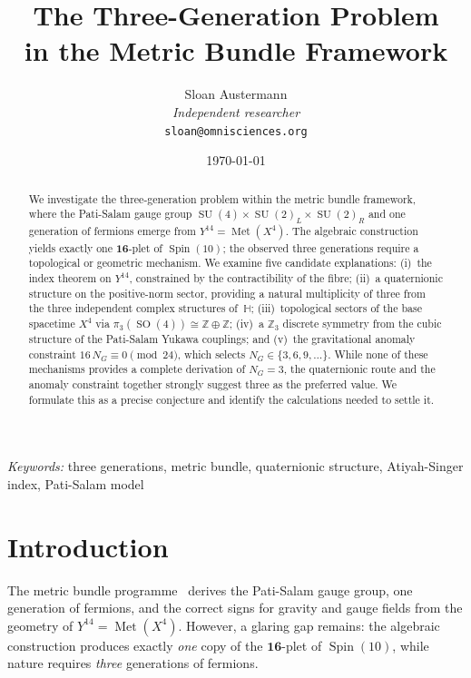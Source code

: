 \documentclass[12pt,a4paper]{article}
\title{\textbf{The Three-Generation Problem\\ in the Metric Bundle Framework}}
\author{Sloan Austermann\\[4pt]
\small\textit{Independent researcher}\\
\small\texttt{sloan@omnisciences.org}}
\date{\today}
\theoremstyle{definition}
\newcommand{\Met}{\operatorname{Met}}
\newcommand{\SO}{\operatorname{SO}}
\newcommand{\SU}{\operatorname{SU}}
\newcommand{\Spin}{\operatorname{Spin}}
\newcommand{\Z}{\mathbb{Z}}
\newcommand{\HH}{\mathbb{H}}
\begin{document}
\maketitle

\begin{abstract}
We investigate the three-generation problem within the metric bundle framework, where the Pati-Salam gauge group $\SU(4) \times \SU(2)_L \times \SU(2)_R$ and one generation of fermions emerge from $Y^{14} = \Met(X^4)$.
The algebraic construction yields exactly one $\mathbf{16}$-plet of $\Spin(10)$; the observed three generations require a topological or geometric mechanism.
We examine five candidate explanations: (i)~the index theorem on $Y^{14}$, constrained by the contractibility of the fibre; (ii)~a quaternionic structure on the positive-norm sector, providing a natural multiplicity of three from the three independent complex structures of~$\HH$; (iii)~topological sectors of the base spacetime $X^4$ via $\pi_3(\SO(4)) \cong \Z \oplus \Z$; (iv)~a $\Z_3$ discrete symmetry from the cubic structure of the Pati-Salam Yukawa couplings; and (v)~the gravitational anomaly constraint $16\, N_G \equiv 0 \pmod{24}$, which selects $N_G \in \{3, 6, 9, \ldots\}$.
While none of these mechanisms provides a complete derivation of $N_G = 3$, the quaternionic route and the anomaly constraint together strongly suggest three as the preferred value.
We formulate this as a precise conjecture and identify the calculations needed to settle it.
\end{abstract}

\vspace{10pt}
\noindent\textit{Keywords:} three generations, metric bundle, quaternionic structure, Atiyah-Singer index, Pati-Salam model

\newpage
\tableofcontents
\newpage

\section{Introduction}
\label{sec:intro}

The metric bundle programme~\cite{Paper1,Paper2,Paper3,Paper4} derives the Pati-Salam gauge group, one generation of fermions, and the correct signs for gravity and gauge fields from the geometry of $Y^{14} = \Met(X^4)$.
However, a glaring gap remains: the algebraic construction produces exactly \emph{one} copy of the $\mathbf{16}$-plet of $\Spin(10)$, while nature requires \emph{three} generations of fermions.
\end{document}
